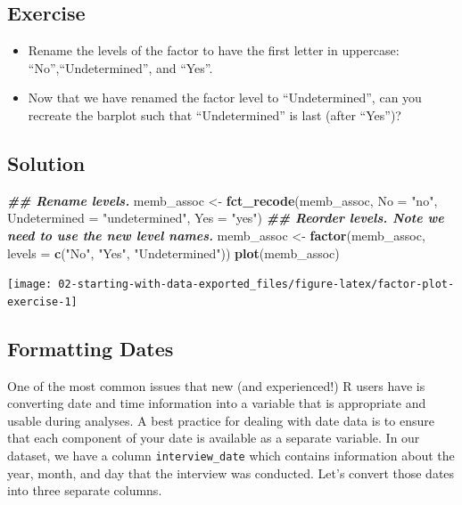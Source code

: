\documentclass[
]{article}
\newenvironment{Shaded}{\begin{snugshade}}{\end{snugshade}}
\newcommand{\AttributeTok}[1]{\textcolor[rgb]{0.13,0.29,0.53}{#1}}
\newcommand{\DocumentationTok}[1]{\textcolor[rgb]{0.56,0.35,0.01}{\textbf{\textit{#1}}}}
\newcommand{\FunctionTok}[1]{\textcolor[rgb]{0.13,0.29,0.53}{\textbf{#1}}}
\newcommand{\NormalTok}[1]{#1}
\newcommand{\OtherTok}[1]{\textcolor[rgb]{0.56,0.35,0.01}{#1}}
\newcommand{\StringTok}[1]{\textcolor[rgb]{0.31,0.60,0.02}{#1}}
\begin{document}
\subsection{Exercise}\label{exercise-1}

\begin{itemize}
\item
  Rename the levels of the factor to have the first letter in uppercase:
  ``No'',``Undetermined'', and ``Yes''.
\item
  Now that we have renamed the factor level to ``Undetermined'', can you
  recreate the barplot such that ``Undetermined'' is last (after
  ``Yes'')?
\end{itemize}

\subsection{Solution}\label{solution-1}

\begin{Shaded}
\begin{Highlighting}[]
\DocumentationTok{\#\# Rename levels.}
\NormalTok{memb\_assoc }\OtherTok{\textless{}{-}} \FunctionTok{fct\_recode}\NormalTok{(memb\_assoc, }\AttributeTok{No =} \StringTok{"no"}\NormalTok{,}
                         \AttributeTok{Undetermined =} \StringTok{"undetermined"}\NormalTok{, }\AttributeTok{Yes =} \StringTok{"yes"}\NormalTok{)}
\DocumentationTok{\#\# Reorder levels. Note we need to use the new level names.}
\NormalTok{memb\_assoc }\OtherTok{\textless{}{-}} \FunctionTok{factor}\NormalTok{(memb\_assoc, }\AttributeTok{levels =} \FunctionTok{c}\NormalTok{(}\StringTok{"No"}\NormalTok{, }\StringTok{"Yes"}\NormalTok{, }\StringTok{"Undetermined"}\NormalTok{))}
\FunctionTok{plot}\NormalTok{(memb\_assoc)}
\end{Highlighting}
\end{Shaded}

\texttt{[image: 02-starting-with-data-exported\_files/figure-latex/factor-plot-exercise-1]}

\subsection{Formatting Dates}\label{formatting-dates}

One of the most common issues that new (and experienced!) R users have
is converting date and time information into a variable that is
appropriate and usable during analyses. A best practice for dealing with
date data is to ensure that each component of your date is available as
a separate variable. In our dataset, we have a column
\texttt{interview\_date} which contains information about the year,
month, and day that the interview was conducted. Let's convert those
dates into three separate columns.
\end{document}
